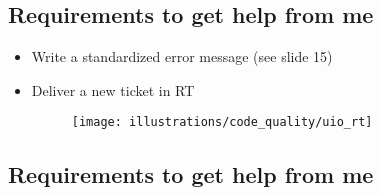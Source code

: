 \documentclass[usenames,dvipsnames]{beamer}
\theoremstyle{plain}
\theoremstyle{definition}
\begin{document}
\subsection{Requirements to get help from me}

\begin{frame}{\setframetitle{}}
  {
    \begin{itemize}
    \item Write a standardized error message (see slide 15)

    \item Deliver a new ticket in RT

      \begin{figure}
        \captionsetup[subfigure]{justification=centering}
        \centering
        {\texttt{[image: illustrations/code\_quality/uio\_rt]}}
      \end{figure}


    \end{itemize}
  }
\end{frame}






\subsection{Requirements to get help from me}
\end{document}

